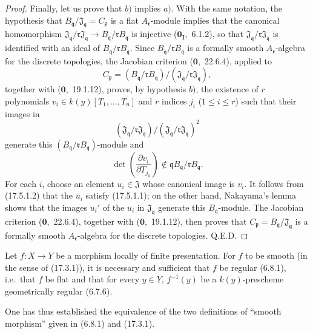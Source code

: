 \begin{proof}
Finally, let us prove that $b)$ implies $a)$.
With the same notation, the hypothesis that $B_\mathfrak{q}/\mathfrak{J}_\mathfrak{q}=C_\mathfrak{p}$ is a flat $A_\mathfrak{r}$-module implies that the canonical homomorphism $\mathfrak{J}_\mathfrak{q}/\mathfrak{r}\mathfrak{J}_\mathfrak{q}\to B_\mathfrak{q}/\mathfrak{r}B_\mathfrak{q}$ is injective ($\mathbf{0}_\mathbf{I}$,~6.1.2), so that $\mathfrak{J}_\mathfrak{q}/\mathfrak{r}\mathfrak{J}_\mathfrak{q}$ is identified with an ideal of $B_\mathfrak{q}/\mathfrak{r}B_\mathfrak{q}$.
Since $B_\mathfrak{q}/\mathfrak{r}B_\mathfrak{q}$ is a formally smooth $A_\mathfrak{r}$-algebra for the discrete topologies, the Jacobian criterion ($\mathbf{0}$,~22.6.4), applied to
\[
C_\mathfrak{p}=(B_\mathfrak{q}/\mathfrak{r}B_\mathfrak{q})/(\mathfrak{J}_\mathfrak{q}/\mathfrak{r}\mathfrak{J}_\mathfrak{q}),
\]
together with ($\mathbf{0}$,~19.1.12), proves, by hypothesis $b)$, the existence of $r$ polynomials $v_i\in k(y)[T_1,\ldots,T_n]$ and $r$ indices $j_i$ ($1\leqslant i\leqslant r$) such that their images in
\[
(\mathfrak{J}_\mathfrak{q}/\mathfrak{r}\mathfrak{J}_\mathfrak{q})/(\mathfrak{J}_\mathfrak{q}/\mathfrak{r}\mathfrak{J}_\mathfrak{q})^2
\]
generate this $(B_\mathfrak{q}/\mathfrak{r}B_\mathfrak{q})$-module and
\[
\tag{17.5.1.2}
\det\left(\frac{\partial v_i}{\partial T_{j_k}}\right)\notin\mathfrak{q}B_\mathfrak{q}/\mathfrak{r}B_\mathfrak{q}.
\]
For each $i$, choose an element $u_i\in\mathfrak{J}$ whose canonical image is $v_i$.
It follows from (17.5.1.2) that the $u_i$ satisfy (17.5.1.1); on the other hand, Nakayama's lemma shows that the images $u_i'$ of the $u_i$ in $\mathfrak{J}_\mathfrak{q}$ generate this $B_\mathfrak{q}$-module.
The Jacobian criterion ($\mathbf{0}$,~22.6.4), together with ($\mathbf{0}$,~19.1.12), then proves that $C_\mathfrak{p}=B_\mathfrak{q}/\mathfrak{J}_\mathfrak{q}$ is a formally smooth $A_\mathfrak{r}$-algebra for the discrete topologies.
Q.E.D.
\end{proof}

\begin{corollary}[17.5.2]
\label{IV.17.5.2}
Let $f:X\to Y$ be a morphism locally of finite presentation.
For $f$ to be smooth (in the sense of (17.3.1)), it is necessary and sufficient that $f$ be regular (6.8.1), i.e.\ that $f$ be flat and that for every $y\in Y$, $f^{-1}(y)$ be a $k(y)$-prescheme geometrically regular (6.7.6).
\end{corollary}

One has thus established the equivalence of the two definitions of ``smooth morphism'' given in (6.8.1) and (17.3.1).

